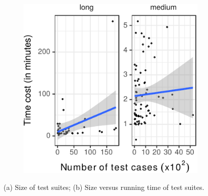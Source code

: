 \begin{center}
\begin{figure}[h!]
\begin{subfigure}{0.13\textwidth}
    \caption{\label{fig:size-testsuites}}
  \end{subfigure}
  \hfill
  \begin{subfigure}{0.28\textwidth}
    \centering
    \includegraphics[width=.9\textwidth]{results/scatter-testcost.pdf}
    \caption{\label{fig:scattercost}}
  \end{subfigure}
  \caption{\label{fig:time-versus-size}(a) Size of test suites; (b)
    Size versus running time of test suites.}%
\end{figure}
\end{center}



